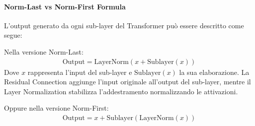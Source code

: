 \paragraph{Norm-Last vs Norm-First Formula}
L'output generato da ogni sub-layer del Transformer può essere descritto come segue:

Nella versione Norm-Last:
\begin{align*}
	\text{Output} = \text{LayerNorm}(x + \text{Sublayer}(x))
\end{align*}
Dove \(x\) rappresenta l'input del sub-layer e \(\text{Sublayer}(x)\) la sua elaborazione. La Residual Connection aggiunge l'input originale all'output del sub-layer, mentre il Layer Normalization stabilizza l'addestramento normalizzando le attivazioni.

Oppure nella versione Norm-First:
\begin{align*}
	\text{Output} = x + \text{Sublayer}(\text{LayerNorm}(x))
\end{align*}

